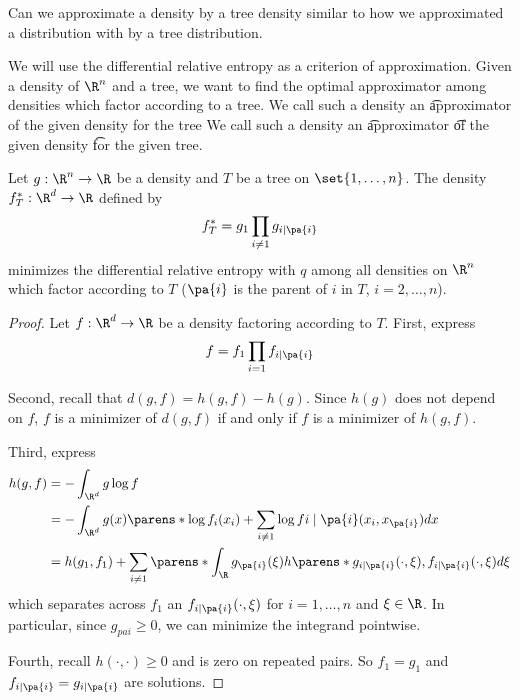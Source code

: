 
Can we approximate a density by a tree density similar to how we approximated a distribution with by a tree distribution.


We will use the differential relative entropy as a criterion of approximation.
Given a density of $\R^n$ and a tree, we want to find the optimal approximator among densities which factor according to a tree.
We call such a density an \t{approximator} of the given density for the tree
We call such a density an \t{approximator} \t{of} the given density \t{for} the given tree.


\begin{prop}

Let $g: \R^n \to \R$ be a density and $T$ be a tree on $\set{1, \dots, n}$.
The density $f^*_T: \R^d \to \R$ defined by
$$
  f^*_T = g_1 \prod_{i \neq 1} g_{i \mid \pa{i}}
$$
  minimizes the differential relative entropy with $q$ among all densities on $\R^n$ which factor according to $T$ ($\pa{i}$ is the parent of $i$ in $T$, $i = 2, \dots, n$).

\begin{proof}

Let $f: \R^d \to \R$ be a density factoring according to $T$. First, express
$$
  f = f_1 \prod_{i = 1} f_{i \mid \pa{i}}
$$

Second, recall that $d(g, f) = h(g, f) - h(g)$.
Since $h(g)$ does not depend on $f$, $f$ is a minimizer of $d(g, f)$ if and only if $f$ is a minimizer of $h(g, f)$.

Third, express
$$
\begin{aligned}
  h(g, f) &= - \int_{\R^d} g \log f \\
          &= - \int_{\R^d} g(x) \parens*{ \log f_{i}(x_i) + \sum_{i \neq 1} \log f{i \mid \pa{i}}(x_i, x_{\pa{i}})} dx \\
          &= h(g_1, f_1) + \sum_{i \neq 1} \parens*{ \int_{\R} g_{\pa{i}}(\xi) h\parens*{g_{i \mid \pa{i}}(\cdot, \xi), f_{i\mid\pa{i}}(\cdot,\xi)}d\xi}
\end{aligned}
$$
which separates across $f_1$ an $f_{i \mid \pa{i}}(\cdot, \xi)$ for $i = 1, \dots, n$ and $\xi \in \R$.
In particular, since $g_{pa{i}} \geq 0$,
we can minimize the integrand pointwise.

Fourth, recall $h(\cdot, \cdot) \geq 0$ and is zero on repeated pairs.
So $f_1 = g_1$ and $f_{i \mid \pa{i}} = g_{i \mid \pa{i}}$ are solutions.

\end{proof}

\end{prop}

\strats
